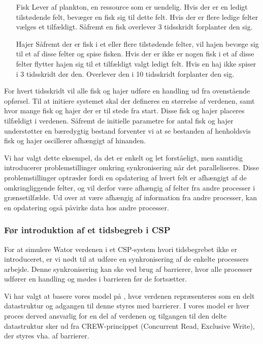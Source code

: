 \begin{itemize}
\item[Fisk]
Lever af plankton, en ressource som er uendelig. Hvis der er en ledigt 
tilstødende felt, bevæger en fisk sig til dette felt. Hvis der er flere ledige 
felter vælges et tilfældigt. Såfremt en fisk overlever 3 tidsskridt forplanter 
den sig.
\item[Hajer]
Såfremt der er fisk i et eller flere tilstødende felter, vil hajen bevæge sig 
til et af disse felter og spise fisken. Hvis der er ikke er nogen fisk i et af 
disse felter flytter hajen sig til et tilfældigt valgt ledigt felt. Hvis en haj 
ikke spiser i 3 tidsskridt dør den. Overlever den i 10 tidsskridt forplanter 
den sig.
\end{itemize}

For hvert tidsskridt vil alle fisk og hajer udføre en handling ud fra
ovenstående opførsel.
Til at initiere systemet skal der defineres en størrelse af verdenen,
samt hvor mange fisk og hajer der er til stede fra start. Disse fisk og
hajer placeres tilfældigt i verdenen.
Såfremt de initielle parametre for antal fisk og hajer understøtter en 
bæredygtig bestand forventer vi at se bestanden af henholdsvis fisk og hajer 
oscillerer afhængigt af hinanden.

Vi har valgt dette eksempel, da det er enkelt og let forståeligt, men samtidig 
introducerer problemstillinger omkring synkronisering når det paralleliseres.  
Disse problemstillinger optræder fordi en opdatering af hvert felt er afhængigt 
af de omkringliggende felter, og vil derfor være afhængig af felter fra andre 
processer i grænsetilfælde. Ud over at være afhængig af information fra andre 
processer, kan en opdatering også påvirke data hos andre processer.   

\subsubsection*{Før introduktion af et tidsbegreb i CSP} For at simulere Wator 
verdenen i et CSP-system hvori tidsbegrebet ikke er introduceret, er vi nødt 
til at udføre en synkronisering af de enkelte processers arbejde. Denne 
synkronisering kan ske ved brug af barrierer, hvor alle processer udfører en 
handling og mødes i barrieren før de fortsætter.

Vi har valgt at basere vores model på \cite{crew}, hvor verdenen repræsenteres 
som en delt datastruktur og adgangen til denne styres med barrierer. I vores 
model er hver proces derved ansvarlig for en del af verdenen og tilgangen til 
den delte datastruktur sker ud fra CREW-princippet (Concurrent Read, Exclusive 
Write)\cite[5]{crew}, der styres vha. af barrierer. 

